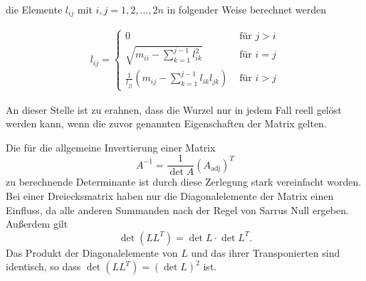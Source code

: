 die Elemente $l_{ij}$ mit $i,j=1,2,\dots,2n$ in folgender Weise berechnet werden

\begin{equation}
\begin{aligned}
	l_{ij}=
	\begin{cases}
	0 &\text{ für } j>i\\
	\sqrt{m_{ii}-\sum \limits_{k=1}^{j-1}l^{2}_{ik}} &\text{ für } i=j\\
	\frac{1}{l_{jj}} \left( m_{ij}-\sum \limits_{k=1}^{j-1}l_{ik}l_{jk}\right) &\text{ für } i>j
	\end{cases}
\end{aligned}
\end{equation}

An dieser Stelle ist zu erahnen, dass die Wurzel nur in jedem Fall reell gelöst werden kann, wenn die zuvor genannten Eigenschaften der Matrix gelten.

Die für die allgemeine Invertierung einer Matrix  $$ A^{-1} = \dfrac{1}{\det A}(A_{\mathrm{adj}})^{T}$$zu berechnende Determinante ist durch diese Zerlegung stark vereinfacht worden. Bei einer Dreiecksmatrix haben nur die Diagonalelemente der Matrix einen Einfluss, da alle anderen Summanden nach der Regel von Sarrus Null ergeben. Außerdem gilt $$\det({L} {L}^T)=\det{L}\cdot\det{L}^T.$$ Das Produkt der Diagonalelemente von ${L}$ und das ihrer Transponierten sind identisch, so dass $\det({L} {L}^T)=(\det{L})^2$ ist.

